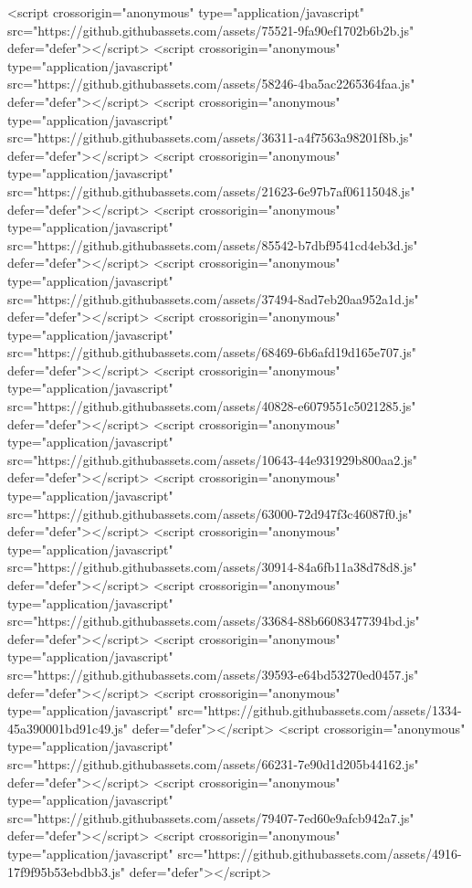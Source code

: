 <script crossorigin="anonymous" type="application/javascript" src="https://github.githubassets.com/assets/75521-9fa90ef1702b6b2b.js" defer="defer"></script>
<script crossorigin="anonymous" type="application/javascript" src="https://github.githubassets.com/assets/58246-4ba5ac2265364faa.js" defer="defer"></script>
<script crossorigin="anonymous" type="application/javascript" src="https://github.githubassets.com/assets/36311-a4f7563a98201f8b.js" defer="defer"></script>
<script crossorigin="anonymous" type="application/javascript" src="https://github.githubassets.com/assets/21623-6e97b7af06115048.js" defer="defer"></script>
<script crossorigin="anonymous" type="application/javascript" src="https://github.githubassets.com/assets/85542-b7dbf9541cd4eb3d.js" defer="defer"></script>
<script crossorigin="anonymous" type="application/javascript" src="https://github.githubassets.com/assets/37494-8ad7eb20aa952a1d.js" defer="defer"></script>
<script crossorigin="anonymous" type="application/javascript" src="https://github.githubassets.com/assets/68469-6b6afd19d165e707.js" defer="defer"></script>
<script crossorigin="anonymous" type="application/javascript" src="https://github.githubassets.com/assets/40828-e6079551c5021285.js" defer="defer"></script>
<script crossorigin="anonymous" type="application/javascript" src="https://github.githubassets.com/assets/10643-44e931929b800aa2.js" defer="defer"></script>
<script crossorigin="anonymous" type="application/javascript" src="https://github.githubassets.com/assets/63000-72d947f3c46087f0.js" defer="defer"></script>
<script crossorigin="anonymous" type="application/javascript" src="https://github.githubassets.com/assets/30914-84a6fb11a38d78d8.js" defer="defer"></script>
<script crossorigin="anonymous" type="application/javascript" src="https://github.githubassets.com/assets/33684-88b66083477394bd.js" defer="defer"></script>
<script crossorigin="anonymous" type="application/javascript" src="https://github.githubassets.com/assets/39593-e64bd53270ed0457.js" defer="defer"></script>
<script crossorigin="anonymous" type="application/javascript" src="https://github.githubassets.com/assets/1334-45a390001bd91c49.js" defer="defer"></script>
<script crossorigin="anonymous" type="application/javascript" src="https://github.githubassets.com/assets/66231-7e90d1d205b44162.js" defer="defer"></script>
<script crossorigin="anonymous" type="application/javascript" src="https://github.githubassets.com/assets/79407-7ed60e9afcb942a7.js" defer="defer"></script>
<script crossorigin="anonymous" type="application/javascript" src="https://github.githubassets.com/assets/4916-17f9f95b53ebdbb3.js" defer="defer"></script>
